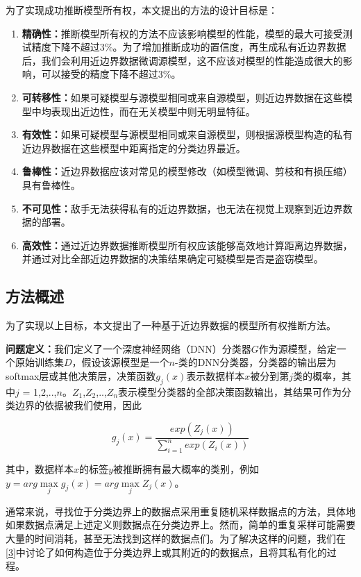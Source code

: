 为了实现成功推断模型所有权，本文提出的方法的设计目标是：
\begin{enumerate}
	\renewcommand{\labelenumi}{\theenumi)}
	\item \textbf{精确性：}推断模型所有权的方法不应该影响模型的性能，模型的最大可接受测试精度下降不超过3\%。为了增加推断成功的置信度，再生成私有近边界数据后，我们会利用近边界数据微调源模型，这不应该对模型的性能造成很大的影响，可以接受的精度下降不超过3\%。
	\item \textbf{可转移性：}如果可疑模型与源模型相同或来自源模型，则近边界数据在这些模型中均表现出近边性，而在无关模型中则无明显特征。
	\item \textbf{有效性：}如果可疑模型与源模型相同或来自源模型，则根据源模型构造的私有近边界数据在这些模型中距离指定的分类边界最近。
	\item \textbf{鲁棒性：}近边界数据应该对常见的模型修改（如模型微调、剪枝和有损压缩）具有鲁棒性。
	\item \textbf{不可见性：}敌手无法获得私有的近边界数据，也无法在视觉上观察到近边界数据的部署。
	\item \textbf{高效性：}通过近边界数据推断模型所有权应该能够高效地计算距离边界数据，并通过对比全部近边界数据的决策结果确定可疑模型是否是盗窃模型。
\end{enumerate}

\subsection{方法概述}

为了实现以上目标，本文提出了一种基于近边界数据的模型所有权推断方法。

\noindent\textbf{问题定义：}我们定义了一个深度神经网络（DNN）分类器$G$作为源模型，给定一个原始训练集$D$，假设该源模型是一个$n$-类的DNN分类器，分类器的输出层为softmax层或其他决策层，决策函数$g_j(x)$表示数据样本$x$被分到第$j$类的概率，其中$j$ = 1,2,..,$n$。$Z_1$,$Z_2$,..,$Z_n$表示模型分类器的全部决策函数输出，其结果可作为分类边界的依据被我们使用，因此

\begin{equation}
	g_j(x) = \frac{exp(Z_j(x))}{\sum_{i = 1}^n exp(Z_i(x))}
\end{equation}

\noindent 其中，数据样本$x$的标签$y$被推断拥有最大概率的类别，例如$y = arg \mathop{max} \limits_j g_j(x) = arg \mathop{max} \limits_j Z_j(x)$。



通常来说，寻找位于分类边界上的数据点采用重复随机采样数据点的方法，具体地如果数据点满足上述定义则数据点在分类边界上。然而，简单的重复采样可能需要大量的时间消耗，甚至无法找到这样的数据点们。为了解决这样的问题，我们在\ref{3}中讨论了如何构造位于分类边界上或其附近的的数据点，且将其私有化的过程。

